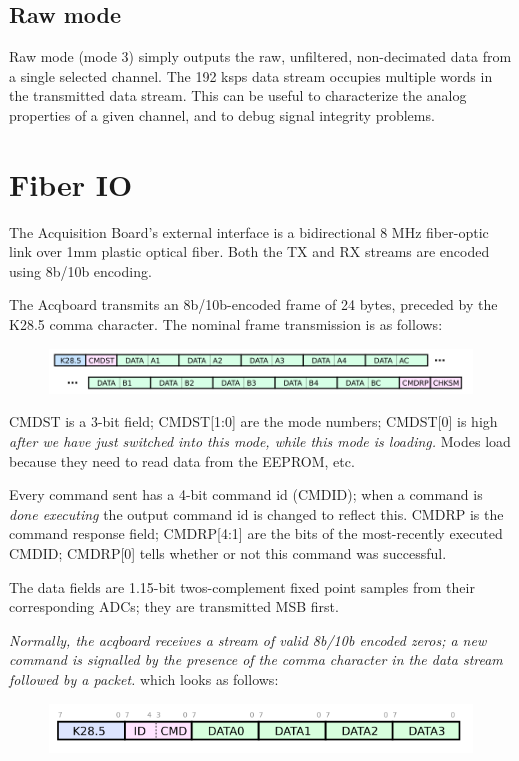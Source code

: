 \subsection{Raw mode}
Raw mode (mode 3) simply outputs the raw, unfiltered, non-decimated
data from a single selected channel. The 192 ksps data stream occupies
multiple words in the transmitted data stream. This can be useful to
characterize the analog properties of a given channel, and to debug
signal integrity problems.


\section{Fiber IO}
The Acquisition Board's external interface is a bidirectional 8 MHz
fiber-optic link over  1mm plastic optical fiber. Both the TX
and RX streams are encoded using 8b/10b encoding.

The Acqboard transmits an 8b/10b-encoded frame of 24 bytes, preceded
by the K28.5 comma character. The nominal frame transmission is as
follows:

\begin{figure}[h!]
\includegraphics[scale=1.0]{txpacket.svg}
\end{figure}

CMDST is a 3-bit field; CMDST[1:0] are the mode numbers; CMDST[0] is
high \textit{after we have just switched into this mode, while this
  mode is loading.} Modes load because they need to read data from the
EEPROM, etc.

Every command sent has a 4-bit command id (CMDID); when a command is
\textit{done executing} the output command id is changed to reflect
this. CMDRP is the command response field; CMDRP[4:1] are the bits of
the most-recently executed CMDID; CMDRP[0] tells whether or not this
command was successful.

The data fields are 1.15-bit twos-complement fixed point samples from
their corresponding ADCs; they are transmitted MSB first.

\emph{Normally, the acqboard receives a stream of valid 8b/10b encoded
  zeros; a new command is signalled by the presence of the comma
  character in the data stream followed by a packet. } which looks as follows:

\begin{figure}[h!]
\includegraphics[scale=1.0]{rxpacket.svg}
\end{figure}

